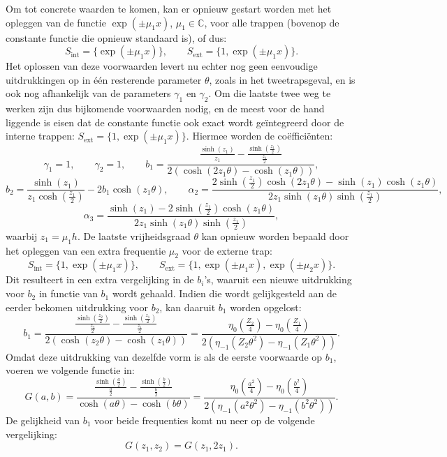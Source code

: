 \documentclass[12pt]{article}
\begin{document}
Om tot concrete waarden te komen, kan er opnieuw gestart worden met het opleggen van de functie \(\exp(\pm\mu_1x)\), \(\mu_1\in\mathbb{C}\), voor alle trappen (bovenop de constante functie die opnieuw standaard is), of dus:
\[S_{\textrm{int}}=\{\exp(\pm\mu_1x)\},\qquad S_{\textrm{ext}}=\{1,\exp(\pm\mu_1x)\}.\]
Het oplossen van deze voorwaarden levert nu echter nog geen eenvoudige uitdrukkingen op in één resterende parameter \(\theta\), zoals in het tweetrapsgeval, en is ook nog afhankelijk van de parameters \(\gamma_1\) en \(\gamma_2\). Om die laatste twee weg te werken zijn dus bijkomende voorwaarden nodig, en de meest voor de hand liggende is eisen dat de constante functie ook exact wordt geïntegreerd door de interne trappen: \(S_{\textrm{ext}}=\{1,\exp(\pm\mu_1x)\}\). Hiermee worden de coëfficiënten:
\[\gamma_1=1,\qquad\gamma_2=1,\qquad b_1=\frac{\frac{\sinh(z_1)}{z_1}-\frac{\sinh(\frac{z_1}{2})}{\frac{z_1}{2}}}{2(\cosh(2z_1\theta)-\cosh(z_1\theta))},\]
\[b_2=\frac{\sinh(z_1)}{z_1\cosh(\frac{z_1}{2})}-2b_1\cosh(z_1\theta),\qquad\alpha_2=\frac{2\sinh(\frac{z_1}{2})\cosh(2z_1\theta)-\sinh(z_1)\cosh(z_1\theta)}{2z_1\sinh(z_1\theta)\sinh(\frac{z_1}{2})},\]
\[\alpha_3=\frac{\sinh(z_1)-2\sinh(\frac{z_1}{2})\cosh(z_1\theta)}{2z_1\sinh(z_1\theta)\sinh(\frac{z_1}{2})},\]
waarbij \(z_1=\mu_1h\). De laatste vrijheidsgraad \(\theta\) kan opnieuw worden bepaald door het opleggen van een extra frequentie \(\mu_2\) voor de externe trap:
\[S_{\textrm{int}}=\{1,\exp(\pm\mu_1x)\},\qquad S_{\textrm{ext}}=\{1,\exp(\pm\mu_1x),\exp(\pm\mu_2x)\}.\]
Dit resulteert in een extra vergelijking in de \(b_i\)'s, waaruit een nieuwe uitdrukking voor \(b_2\) in functie van \(b_1\) wordt gehaald. Indien die wordt gelijkgesteld aan de eerder bekomen uitdrukking voor \(b_2\), kan daaruit \(b_1\) worden opgelost:
\[b_1=\frac{\frac{\sinh(\frac{z_2}{2})}{\frac{z_2}{2}}-\frac{\sinh(\frac{z_1}{2})}{\frac{z_1}{2}}}{2(\cosh(z_2\theta)-\cosh(z_1\theta))}=\frac{\eta_0\left(\frac{Z_2}{4}\right)-\eta_0\left(\frac{Z_1}{4}\right)}{2(\eta_{-1}(Z_2\theta^2)-\eta_{-1}(Z_1\theta^2))}.\]
Omdat deze uitdrukking van dezelfde vorm is als de eerste voorwaarde op \(b_1\), voeren we volgende functie in:
\[G(a,b)=\frac{\frac{\sinh(\frac{a}{2})}{\frac{a}{2}}-\frac{\sinh(\frac{b}{2})}{\frac{b}{2}}}{\cosh(a\theta)-\cosh(b\theta)}=\frac{\eta_0\left(\frac{a^2}{4}\right)-\eta_0\left(\frac{b^2}{4}\right)}{2(\eta_{-1}(a^2\theta^2)-\eta_{-1}(b^2\theta^2))}.\]
De gelijkheid van \(b_1\) voor beide frequenties komt nu neer op de volgende vergelijking:
\begin{equation} \label{eq:thetaeqs3}
    G(z_1,z_2)=G(z_1,2z_1).
\end{equation}
\end{document}

